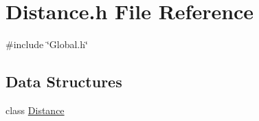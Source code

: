 \section{Distance.h File Reference}
\label{Distance_8h}
{\ttfamily \#include \char`\"{}Global.h\char`\"{}}\par
\subsection*{Data Structures}
\begin{DoxyCompactItemize}
\item 
class \hyperlink{classDistance}{Distance}
\end{DoxyCompactItemize}
